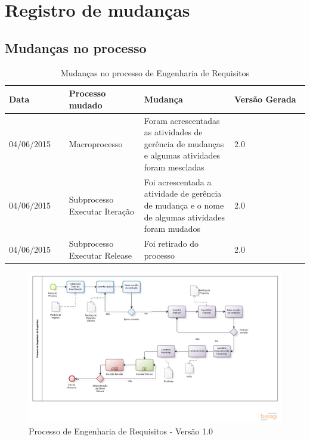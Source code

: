 \chapter{Registro de mudanças}

\section{Mudanças no processo}
\label{mudancas_processo}
\begin{table}[!h]
\centering
\caption{Mudanças no processo de Engenharia de Requisitos}
\label{Rotulo}
  \begin{tabular}{p{0.20\linewidth}p{0.25\linewidth}p{0.30\linewidth}p{0.25\linewidth}}
  \hline
  Data  & Processo mudado & Mudança & Versão Gerada \\
  \hline

  04/06/2015  & Macroprocesso & Foram acrescentadas as atividades de gerência de mudanças e algumas atividades foram mescladas & 2.0 \\
  04/06/2015  & Subprocesso Executar Iteração & Foi acrescentada a atividade de gerência de mudança e o nome de algumas atividades foram mudados & 2.0 \\
  04/06/2015  & Subprocesso Executar Release & Foi retirado do processo & 2.0 \\

  \hline
  \end{tabular}
\end{table}
\begin{figure}[!htb]
\flushleft
\includegraphics[scale=0.5]{figuras/processo1.png}
\caption{Processo de Engenharia de Requisitos - Versão 1.0}
\label{fig:Processo1}
\end{figure}

